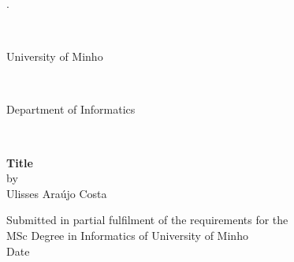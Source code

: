 \thispagestyle{empty}
\begin{center}
\begin{tiny}.\end{tiny}\\
\vspace{3.5cm}
\begin{huge} University of Minho \end{huge} \\
\vspace{0.3cm}
\begin{LARGE} Department of Informatics \end{LARGE} \\
\vspace{5cm}

\begin{large}
\textbf{Title}\\
\vspace{0.2cm}
by\\ 
\vspace{0.2cm}
Ulisses Araújo Costa\\
\end{large}

\vspace{8cm}
Submitted in partial fulfilment of the requirements for the \\
MSc Degree in Informatics of University of Minho\\
\vspace{2cm}
Date\\
\end{center} 
